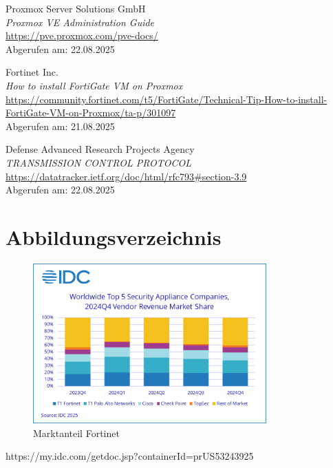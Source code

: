 \documentclass[12pt]{scrreprt}
\begin{document}
\begin{thebibliography}{99}
Proxmox Server Solutions GmbH\\
\emph{Proxmox VE Administration Guide} \\
\url{https://pve.proxmox.com/pve-docs/}\\
Abgerufen am: 22.08.2025

Fortinet Inc.\\
\emph{How to install FortiGate VM on Proxmox} \\
\url{https://community.fortinet.com/t5/FortiGate/Technical-Tip-How-to-install-FortiGate-VM-on-Proxmox/ta-p/301097}\\
Abgerufen am: 21.08.2025


Defense Advanced Research Projects Agency\\
\emph{TRANSMISSION CONTROL PROTOCOL} \\
\url{https://datatracker.ietf.org/doc/html/rfc793#section-3.9}\\
Abgerufen am: 22.08.2025

\chapter{Abbildungsverzeichnis}

	 \begin{figure}[h!]
	\centering
	\includegraphics[width=0.8\textwidth]{Fortinet_Marktanteile.png}
	\caption{Marktanteil Fortinet}
	\label{fig:ER-Modell}
\end{figure}
https://my.idc.com/getdoc.jsp?containerId=prUS53243925



\end{thebibliography}
\end{document}
